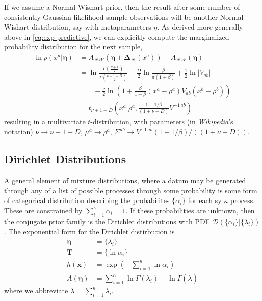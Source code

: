 \documentclass[aps,showpacs,twocolumn,prd,superscriptaddress,nofootinbib]{revtex4}
\newcommand{\nn}{\nonumber}
\begin{document}
If we assume a Normal-Wishart prior, then the result after some number of consistently Gaussian-likelihood sample observations will be another Normal-Wishart distribution, say with metaparameters $\eta$.  As derived more generally above in \eqref{eq:exp-predictive}, we can explicitly compute the marginalized probability distribution for the next sample,
\begin{align}
  \ln p(x^a|\bm\eta)&=A_{\mathcal{NW}}(\bm\eta+\bm\Delta_{\mathcal{N}}(x^a))-A_{\mathcal{NW}}(\bm\eta)\nn\\
  &=\ln\frac{\Gamma\left(\frac{\nu+1}2\right)}{\Gamma\left(\frac{\nu+1-D}{2}\right)}+\frac D2\ln\frac{\beta}{\pi(1+\beta)}+\frac12\ln\left|V_{ab}\right|
  \nn\\&\qquad
  -\frac\nu2\ln\left(1+\frac\beta{1+\beta}(x^a-\rho^a)V_{ab}(x^b-\rho^b)\right)\nn\\
  &=t_{\nu+1-D}\left(x^a\big|\rho^a,\frac{1+1/\beta}{(1+\nu-D)}V^{-1\,ab}\right)\label{eq:norm-predictive}
\end{align}
resulting in a multivariate $t$-distribution, with parameters (in \textit{Wikipedia}'s notation) $\nu\rightarrow\nu+1-D$, $\mu^a\rightarrow\rho^a$, $\Sigma^{ab}\rightarrow V^{-1\,ab}({1+1/\beta})/({(1+\nu-D)})$.


\subsection{Dirichlet Distributions}
A general element of mixture distributions, where a datum may be generated through any of a list of possible processes through some probability is some form of categorical distribution describing the probabilites $\{\alpha_i\}$ for each sy $\kappa$ process.  These are constrained by $\sum_{i=1}^\kappa\alpha_i=1$. If these probabilities are unknown, then the conjugate prior family is the Dirichlet distributions with PDF $\mathcal{D}\left(\{\alpha_i\}|\{\lambda_i\}\right)$.  The exponential form for the Dirichlet distirbution is
\begin{align*}
\bm\eta&=\{\lambda_i\}\\
\bm T&=\{\ln\alpha_i\}\\
h(\bm x)&=\exp\left(-\sum_{i=1}^\kappa\ln\alpha_i\right)\\
A(\bm\eta)&=\sum_{i=1}^\kappa\ln\Gamma(\lambda_i)-\ln\Gamma(\bar\lambda)
\end{align*}
where we abbreviate $\bar\lambda=\sum_{i=1}^\kappa\lambda_i$.
\end{document}
